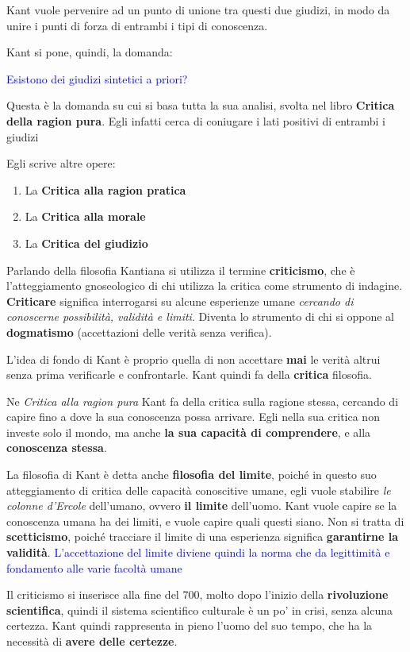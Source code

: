 \documentclass[a4paper, twoside, titlepage]{book}
\renewcommand{\emph}[1]{\textcolor{blue}{#1}}
\begin{document}
Kant vuole pervenire ad un punto di unione tra questi due giudizi, in modo da unire i punti di forza di entrambi i tipi di conoscenza.

Kant si pone, quindi, la domanda:

\emph{Esistono dei giudizi sintetici a priori?}

Questa è la domanda su cui si basa tutta la sua analisi, svolta nel libro \textbf{Critica della ragion pura}.
Egli infatti cerca di coniugare i lati positivi di entrambi i giudizi

Egli scrive altre opere:
\begin{enumerate}
\item La \textbf{Critica alla ragion pratica}
\item La \textbf{Critica alla morale}
\item La \textbf{Critica del giudizio}
\end{enumerate}

Parlando della filosofia Kantiana si utilizza il termine \textbf{criticismo}, che è l’atteggiamento gnoseologico di chi utilizza la critica come strumento di indagine.
\textbf{Criticare} significa interrogarsi su alcune esperienze umane \textit{cercando di conoscerne possibilità, validità e limiti}. Diventa lo strumento di chi si oppone al \textbf{dogmatismo} (accettazioni delle verità senza verifica).

L’idea di fondo di Kant è proprio quella di non accettare \textbf{mai} le verità altrui senza prima verificarle e confrontarle. Kant quindi fa della \textbf{critica} filosofia.

Ne \textit{Critica alla ragion pura} Kant fa della critica sulla ragione stessa, cercando di capire fino a dove la sua conoscenza possa arrivare. Egli nella sua critica non investe solo il mondo, ma anche \textbf{la sua capacità di comprendere}, e alla \textbf{conoscenza stessa}.

La filosofia di Kant è detta anche \textbf{filosofia del limite}, poiché in questo suo atteggiamento di critica delle capacità conoscitive umane, egli vuole stabilire \textit{le colonne d’Ercole} dell’umano, ovvero \textbf{il limite} dell’uomo.
Kant vuole capire se la conoscenza umana ha dei limiti, e vuole capire quali questi siano.
Non si tratta di \textbf{scetticismo}, poiché tracciare il limite di una esperienza significa \textbf{garantirne la validità}.
\emph{L’accettazione del limite diviene quindi la norma che da legittimità e fondamento alle varie facoltà umane}

Il criticismo si inserisce alla fine del 700, molto dopo l’inizio della \textbf{rivoluzione scientifica}, quindi il sistema scientifico culturale è un po’ in crisi, senza alcuna certezza.
Kant quindi rappresenta in pieno l’uomo del suo tempo, che ha la necessità di \textbf{avere delle certezze}.
\end{document}
